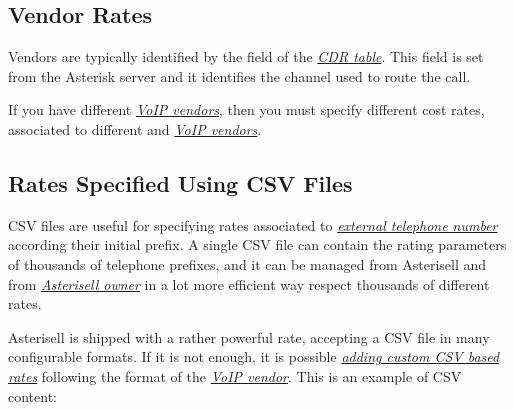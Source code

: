 \documentclass[letterpaper,10pt,english]{sphinxmanual}
\begin{document}
\subsection{Vendor Rates}
\label{index:vendor-rates}
Vendors are typically identified by the  field of the {\hyperref[index:term-cdr-table]{\emph{CDR table}}}. This field is set from the Asterisk server and it identifies the channel used to route the call.

If you have different {\hyperref[index:term-voip-vendor]{\emph{VoIP vendors}}}, then you must specify different cost rates, associated to different  and {\hyperref[index:term-voip-vendor]{\emph{VoIP vendors}}}.


\subsection{Rates Specified Using CSV Files}
\label{index:rates-specified-using-csv-files}
CSV files are useful for specifying rates associated to {\hyperref[index:term-external-telephone-number]{\emph{external telephone number}}} according their initial prefix. A single CSV file can contain the rating parameters of thousands of telephone prefixes, and it can be managed from Asterisell and from {\hyperref[index:term-asterisell-owner]{\emph{Asterisell owner}}} in a lot more efficient way respect thousands of different rates.

Asterisell is shipped with a rather powerful rate, accepting a CSV file in many configurable formats. If it is not enough, it is possible {\hyperref[index:asterisell-customizations]{\emph{adding custom CSV based rates}}} following the format of the {\hyperref[index:term-voip-vendor]{\emph{VoIP vendor}}}. This is an example of CSV content:
\end{document}
